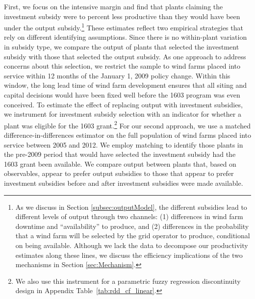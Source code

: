 \documentclass[12pt]{article}
\begin{document}
First, we focus on the intensive margin and find that plants claiming the investment subsidy were  \unskip to percent less productive than they would have been under the output subsidy.\footnote{As we discuss in Section \ref{subsec:outputModel}, the different subsidies lead to different levels of output through two channels: (1) differences in wind farm downtime and ``availability'' to produce, and (2) differences in the probability that a wind farm will be selected by the grid operator to produce, conditional on being available. Although we lack the data to decompose our productivity estimates along these lines, we discuss the efficiency implications of the two mechanisms in Section \ref{sec:Mechanism}.} These estimates reflect two empirical strategies that rely on different identifying assumptions. Since there is no within-plant variation in subsidy type, we compare the output of plants that selected the investment subsidy with those that selected the output subsidy. As one approach to address concerns about this selection, we restrict the sample to wind farms placed into service within 12 months of the January 1, 2009 policy change. Within this window, the long lead time of wind farm development ensures that all siting and capital decisions would have been fixed well before the 1603 program was even conceived. To estimate the effect of replacing output with investment subsidies, we instrument for investment subsidy selection with an indicator for whether a plant was eligible for the 1603 grant.\footnote{We also use this instrument for a parametric fuzzy regression discontinuity design in Appendix Table~\ref{tab:rdd_cf_linear}.} For our second approach, we use a matched difference-in-differences estimator on the full population of wind farms placed into service between 2005 and 2012. We employ matching to identify those plants in the pre-2009 period that would have selected the investment subsidy had the 1603 grant been available. We compare output between plants that, based on observables, appear to prefer output subsidies to those that appear to prefer investment subsidies before and after investment subsidies were made available.
\end{document}
